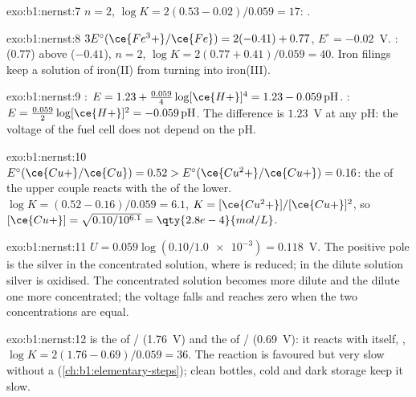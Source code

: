 \begin{solution}{exo:b1:nernst:7}
$n = 2$, $\log K = 2(0.53 - 0.02)/0.059 = 17$: .
\end{solution}

\begin{solution}{exo:b1:nernst:8}
$3E^\circ(\ce{Fe^3+}/\ce{Fe}) = 2(-0.41) + 0.77$, $E^\circ = -0.02$~V.
:   (0.77) above 
 ($-0.41$), $n = 2$, $\log K = 2(0.77 + 0.41)/0.059 = 40$. Iron
filings keep a solution of iron(II) from turning into iron(III).
\end{solution}

\begin{solution}{exo:b1:nernst:9}
: $E = 1.23 + \frac{0.059}{4}\log [\ce{H+}]^4 =
1.23 - 0.059\,\mathrm{pH}$. : $E = \frac{0.059}{2}\log
[\ce{H+}]^2 = -0.059\,\mathrm{pH}$. The difference is $1.23$~V at any pH:
the voltage of the fuel cell does not depend on the pH.
\end{solution}

\begin{solution}{exo:b1:nernst:10}
$E^\circ(\ce{Cu+}/\ce{Cu}) = 0.52 > E^\circ(\ce{Cu^2+}/\ce{Cu+}) = 0.16$: the
  of the upper couple reacts with the   of
the lower. $\log K = (0.52 - 0.16)/0.059 = 6.1$, $K =
[\ce{Cu^2+}]/[\ce{Cu+}]^2$, so $[\ce{Cu+}] = \sqrt{0.10/10^{6.1}} =
\qty{2.8e-4}{mol/L}$.
\end{solution}

\begin{solution}{exo:b1:nernst:11}
$U = 0.059\log(0.10/\num{1.0e-3}) = 0.118$~V. The positive pole is the
silver in the concentrated solution, where  is reduced; in the
dilute solution silver is oxidised. The concentrated solution becomes
more dilute and the dilute one more concentrated; the voltage falls and
reaches zero when the two concentrations are equal.
\end{solution}

\begin{solution}{exo:b1:nernst:12}
 is the  of / (1.76~V) and the 
of / (0.69~V): it reacts with itself, ,
$\log K = 2(1.76 - 0.69)/0.059 = 36$. The reaction is favoured but very
slow without a  (\cref{ch:b1:elementary-steps}); clean bottles,
cold and dark storage keep it slow.
\end{solution}

